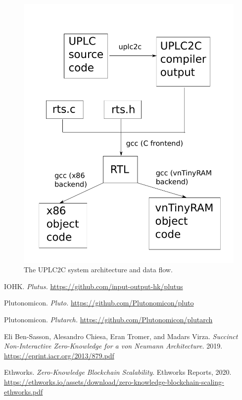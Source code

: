 \documentclass[12pt]{article}
\begin{document}
\begin{figure}
	\includegraphics[width=1.0\columnwidth]{system-and-process-diagram.pdf}
	\caption{The UPLC2C system architecture and data flow.}
\end{figure}

\begin{thebibliography}{5}

	 IOHK. \textit{Plutus.} \url{https://github.com/input-output-hk/plutus}

	 Plutonomicon. \textit{Pluto.} \url{https://github.com/Plutonomicon/pluto}

	 Plutonomicon. \textit{Plutarch.} \url{https://github.com/Plutonomicon/plutarch}

	 Eli Ben-Sasson, Alesandro Chiesa, Eran Tromer, and Madars Virza. \textit{Succinct Non-Interactive Zero-Knowledge for a von Neumann Architecture.} 2019. \url{https://eprint.iacr.org/2013/879.pdf}

Ethworks. \textit{Zero-Knowledge Blockchain Scalability}. Ethworks Reports, 2020. \url{https://ethworks.io/assets/download/zero-knowledge-blockchain-scaling-ethworks.pdf}

\end{thebibliography}
\end{document}
